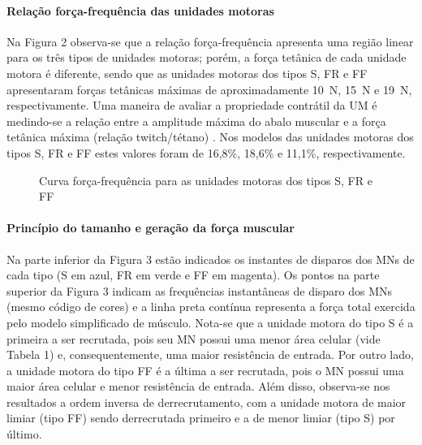 \paragraph{Relação força-frequência das unidades motoras}
Na Figura 2 observa-se que a relação força-frequência apresenta uma região linear para os três tipos de unidades motoras; porém, a força tetânica de cada unidade motora é diferente, sendo que as unidades motoras dos tipos S, FR e FF apresentaram forças tetânicas máximas de aproximadamente 10 N, 15 N e 19 N, respectivamente. Uma maneira de avaliar a propriedade contrátil da UM é medindo-se a relação entre a amplitude máxima do abalo muscular e a força tetânica máxima (relação twitch/tétano) \cite{Kernell2006}. Nos modelos das unidades motoras dos tipos S, FR e FF estes valores foram de 16,8\%, 18,6\% e 11,1\%, respectivamente.

\begin{figure}[h]
  \centering
  \caption{Curva força-frequência para as unidades motoras dos tipos S, FR e FF}
  \label{fig:fig2}
\end{figure}

\paragraph{Princípio do tamanho e geração da força muscular}
Na parte inferior da Figura 3 estão indicados os instantes de disparos dos MNs de cada tipo (S em azul, FR em verde e FF em magenta). Os pontos na parte superior da Figura 3 indicam as frequências instantâneas de disparo dos MNs (mesmo código de cores) e a linha preta contínua representa a força total exercida pelo modelo simplificado de músculo. Nota-se que a unidade motora do tipo S é a primeira a ser recrutada, pois seu MN possui uma menor área celular (vide Tabela 1) e, consequentemente, uma maior resistência de entrada. Por outro lado, a unidade motora do tipo FF é a última a ser recrutada, pois o MN possui uma maior área celular e menor resistência de entrada. Além disso, observa-se nos resultados a ordem inversa de derrecrutamento, com a unidade motora de maior limiar (tipo FF) sendo derrecrutada primeiro e a de menor limiar (tipo S) por último.


